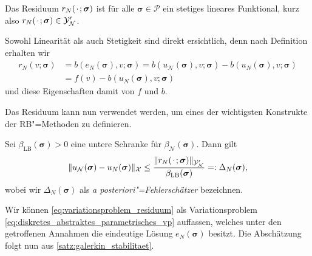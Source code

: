 \documentclass[../main.tex]{subfiles}
\begin{document}
\begin{Lemma}\label{lemma:rbm_residuum_ist_funktional}
    Das Residuum $r_{N}({\mkern2mu\cdot\mkern2mu}; \bm \sigma)$ ist für alle $\bm \sigma \in \mathcal P$ ein stetiges lineares Funktional, kurz also $r_{N}({\mkern2mu\cdot\mkern2mu}; \bm \sigma) \in \mathcal Y_{\mathcal N}'$.

    \begin{Beweis}
        Sowohl Linearität als auch Stetigkeit sind direkt ersichtlich, denn nach Definition erhalten wir
        \begin{equation}\label{eq:residuum_durch_funktional_und_bilinearform}
            \begin{aligned}
            r_{N}(v; \bm \sigma)
            &= b(e_{N}(\bm \sigma), v; \bm \sigma)
            = b(u_{\mathcal N}(\bm \sigma), v; \bm \sigma) - b(u_{N}(\bm \sigma), v; \bm \sigma)
            \\&= f(v) - b(u_{N}(\bm \sigma), v; \bm \sigma)
            \end{aligned}
        \end{equation}
        und diese Eigenschaften damit von $f$ und $b$.
    \end{Beweis}
\end{Lemma}

Das Residuum kann nun verwendet werden, um eines der wichtigsten Konstrukte der RB"=Methoden zu definieren.

\begin{Lemma}\label{lemma:rbm_fehler_schranke}
    Sei $\beta_{\mathrm{LB}}(\bm \sigma) > 0$ eine untere Schranke für $\beta_{\mathcal N}(\bm \sigma)$.
    Dann gilt
    \begin{equation}
        \lVert u_{\mathcal N}(\bm \sigma) - u_{N}(\bm \sigma)\rVert_{\mathcal X} \leq \frac{\lVert r_{N}({\mkern2mu\cdot\mkern2mu}; \bm \sigma)\rVert_{\mathcal Y_{\mathcal N}'}}{\beta_{\mathrm{LB}}(\bm \sigma)} =: \Delta_{N}(\bm \sigma),
    \end{equation}
    wobei wir $\Delta_{N}(\bm \sigma)$ als \emph{a posteriori"=Fehlerschätzer} bezeichnen.

    \begin{Beweis}
        Wir können \cref{eq:variationsproblem_residuum} als Variationsproblem \cref{eq:diskretes_abstraktes_parametrisches_vp} auffassen, welches unter den getroffenen Annahmen die eindeutige Lösung $e_{N}(\bm \sigma)$ besitzt.
        Die Abschätzung folgt nun aus \cref{satz:galerkin_stabilitaet}.
    \end{Beweis}
\end{Lemma}
\end{document}
